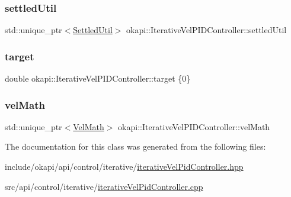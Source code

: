 \subsubsection{\texorpdfstring{settledUtil}{settledUtil}}
{\footnotesize\ttfamily std\+::unique\+\_\+ptr$<$\mbox{\hyperlink{classokapi_1_1SettledUtil}{Settled\+Util}}$>$ okapi\+::\+Iterative\+Vel\+P\+I\+D\+Controller\+::settled\+Util\hspace{0.3cm}{\ttfamily [protected]}}

\mbox{\label{classokapi_1_1IterativeVelPIDController_aa4c6743b6c5fcfe58ea89c726dd26b7c}} 
\subsubsection{\texorpdfstring{target}{target}}
{\footnotesize\ttfamily double okapi\+::\+Iterative\+Vel\+P\+I\+D\+Controller\+::target \{0\}\hspace{0.3cm}{\ttfamily [protected]}}

\mbox{\label{classokapi_1_1IterativeVelPIDController_ada933662b0e7fc732590a46dfc643945}} 
\subsubsection{\texorpdfstring{velMath}{velMath}}
{\footnotesize\ttfamily std\+::unique\+\_\+ptr$<$\mbox{\hyperlink{classokapi_1_1VelMath}{Vel\+Math}}$>$ okapi\+::\+Iterative\+Vel\+P\+I\+D\+Controller\+::vel\+Math\hspace{0.3cm}{\ttfamily [protected]}}



The documentation for this class was generated from the following files\+:\begin{DoxyCompactItemize}
\item 
include/okapi/api/control/iterative/\mbox{\hyperlink{iterativeVelPidController_8hpp}{iterative\+Vel\+Pid\+Controller.\+hpp}}\item 
src/api/control/iterative/\mbox{\hyperlink{iterativeVelPidController_8cpp}{iterative\+Vel\+Pid\+Controller.\+cpp}}\end{DoxyCompactItemize}
